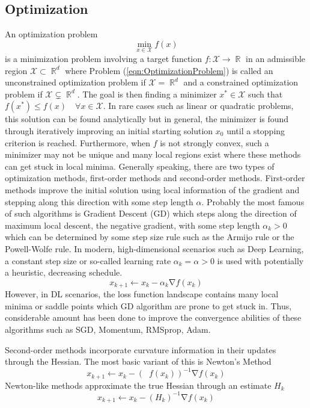 \documentclass[a4paper, 11pt, oneside]{scrartcl}
\theoremstyle{break}
\DeclareMathOperator{\Real}{\mathbb{R}}
\DeclareMathOperator{\grad}{\nabla}
\DeclareMathOperator{\Hessian}{\nabla^2}
\newcommand{\set}[1]{\mathcal{#1}}
\numberwithin{equation}{section}
\begin{document}
		\subsection{Optimization} %
			An optimization problem 
			\begin{equation}
				\min_{x \in \set{X}} f(x)
				\label{eqn:OptimizationProblem}
			\end{equation}
			is a minimization problem involving a target function $f: \set{X} \to \Real$ in an admissible region $\set{X} \subset \Real^d$ where Problem (\ref{eqn:OptimizationProblem}) is called an unconstrained optimization problem if $\set{X} = \Real^d$ and a constrained optimization problem if $\set{X} \subsetneq \Real^d$.
			The goal is then finding a minimizer $x^{*} \in \set{X}$ such that $f(x^*) \le f(x) \quad \forall x \in \set{X}$.
			In rare cases such as linear or quadratic problems, this solution can be found analytically but in general, the minimizer is found through iteratively improving an initial starting solution $x_0$ until a stopping criterion is reached. 
			Furthermore, when $f$ is not strongly convex, such a minimizer may not be unique and many local regions exist where these methods can get stuck in local minima. 
			Generally speaking, there are two types of optimization methods, first-order methods and second-order methods. 
			First-order methods improve the initial solution using local information of the gradient and stepping along this direction with some step length $\alpha$. 
			Probably the most famous of such algorithms is Gradient Descent (GD) which steps along the direction of maximum local descent, the negative gradient, with some step length $\alpha_k > 0$ which can be determined by some step size rule such as the Armijo rule or the Powell-Wolfe rule. 
			In modern, high-dimensional scenarios such as Deep Learning, a constant step size or so-called learning rate $\alpha_k = \alpha > 0$ is used with potentially a heuristic, decreasing schedule.
			\begin{equation}
				x_{k+1} \leftarrow x_k - \alpha_k \grad f(x_k)
				\label{eqn:GradientDescent}
			\end{equation}
			However, in DL scenarios, the loss function landscape contains many local minima or saddle points which GD algorithm are prone to get stuck in. 
			Thus, considerable amount has been done to improve the convergence abilities of these algorithms such as SGD, Momentum, RMSprop, Adam. 

			Second-order methods incorporate curvature information in their updates through the Hessian.
			The most basic variant of this is Newton's Method
			\begin{equation}
				x_{k+1} \leftarrow x_k - \left(\Hessian f(x_k) \right)^{-1} \grad f(x_k)
				\label{eqn:NewtonMethod}
			\end{equation}
			Newton-like methods approximate the true Hessian through an estimate $H_k$ 
			\begin{equation}
				x_{k+1} \leftarrow x_k - \left(H_k \right)^{-1} \grad f(x_k)
				\label{eqn:Newton-likeMethod}
			\end{equation}
\end{document}
